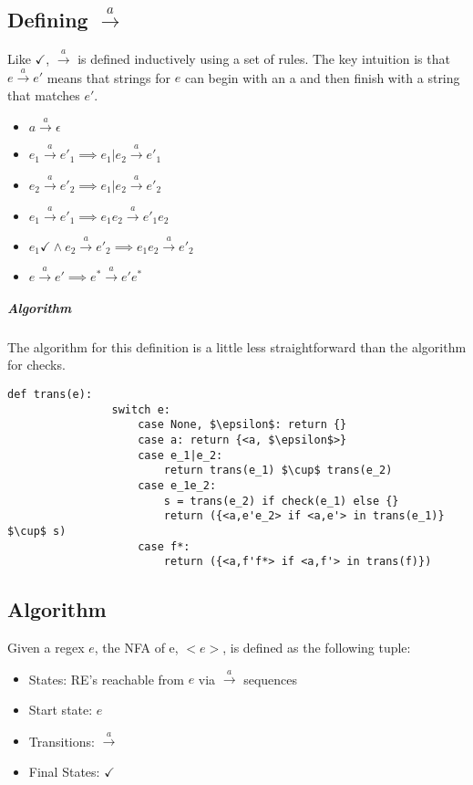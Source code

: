\documentclass[11pt]{article}
\begin{document}
	\subsection{Defining $\xrightarrow{a}$}
		Like $\checkmark$, $\xrightarrow{a}$ is defined inductively using a set of rules. The key intuition is that $e\xrightarrow{a} e'$ means that strings for $e$ can begin with an a and then finish with a string that matches $e'$.
		\begin{itemize}
			\item $a \xrightarrow{a} \epsilon$
			\item $e_1 \xrightarrow{a} e'_1 \implies e_1|e_2 \xrightarrow{a} e'_1$
			\item $e_2 \xrightarrow{a} e'_2 \implies e_1|e_2 \xrightarrow{a} e'_2$
			\item $e_1 \xrightarrow{a} e'_1 \implies e_1e_2 \xrightarrow{a} e'_1e_2$
			\item $e_1\checkmark \wedge e_2 \xrightarrow{a} e'_2 \implies e_1e_2 \xrightarrow{a} e'_2$
			\item $e \xrightarrow{a} e' \implies e^* \xrightarrow{a} e'e^*$
		\end{itemize}
		\subparagraph{Algorithm} The algorithm for this definition is a little less straightforward than the algorithm for checks.
		\begin{lstlisting}[autogobble=true,mathescape]
			def trans(e):
				switch e:
					case None, $\epsilon$: return {}
					case a: return {<a, $\epsilon$>}
					case e_1|e_2:
						return trans(e_1) $\cup$ trans(e_2)
					case e_1e_2:
						s = trans(e_2) if check(e_1) else {}
						return ({<a,e'e_2> if <a,e'> in trans(e_1)} $\cup$ s)
					case f*:
						return ({<a,f'f*> if <a,f'> in trans(f)})
		\end{lstlisting}
		
	\subsection{Algorithm}
		Given a regex $e$, the NFA of e, $<e>$, is defined as the following tuple:
		\begin{itemize}
			\item States: RE's reachable from $e$ via $\xrightarrow{a}$ sequences
			\item Start state: $e$
			\item Transitions: $\xrightarrow{a}$
			\item Final States: $\checkmark$
		\end{itemize}
		
\end{document}
